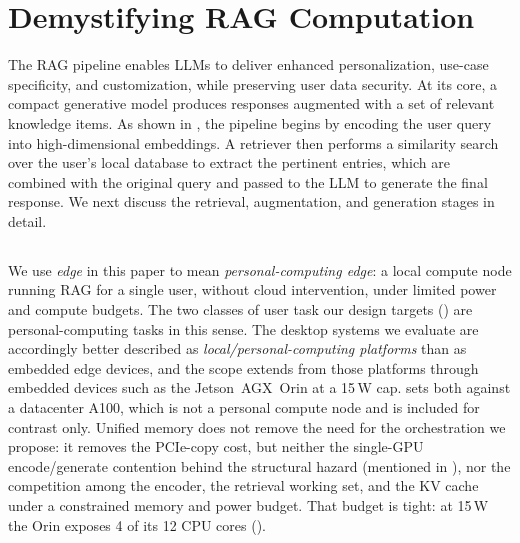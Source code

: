 \section{Demystifying RAG Computation}
\label{sec:02BGnMotivation}
%

The RAG pipeline enables LLMs to deliver enhanced personalization, use-case specificity, and customization, while preserving user data security. At its core, a compact generative model produces responses augmented with a set of \topk{} relevant knowledge items. As shown in , the pipeline begins by encoding the user query into high-dimensional embeddings. A retriever then performs a similarity search over the user’s local database to extract the \topk{} pertinent entries, which are combined with the original query and passed to the LLM to generate the final response. We next discuss the retrieval, augmentation, and generation stages in detail.

\subsection{\texorpdfstring{}{Deployment Scope}}
\label{sec:BG:Scope}
\begin{newtext}
We use \emph{edge} in this paper to mean \emph{personal-computing edge}: a local compute node running RAG for a single user, without cloud intervention, under limited power and compute budgets. The two classes of user task our design targets () are personal-computing tasks in this sense. The desktop systems we evaluate are accordingly better described as \emph{local/personal-computing platforms} than as embedded edge devices, and the scope extends from those platforms through embedded devices such as the Jetson~AGX~Orin at a 15\,W cap.  sets both against a datacenter A100, which is not a personal compute node and is included for contrast only. Unified memory does not remove the need for the orchestration we propose: it removes the PCIe-copy cost, but neither the single-GPU encode/generate contention behind the structural hazard (mentioned in ), nor the competition among the encoder, the retrieval working set, and the KV cache under a constrained memory and power budget. That budget is tight: at 15\,W the Orin exposes 4 of its 12 CPU cores ().
\end{newtext}

